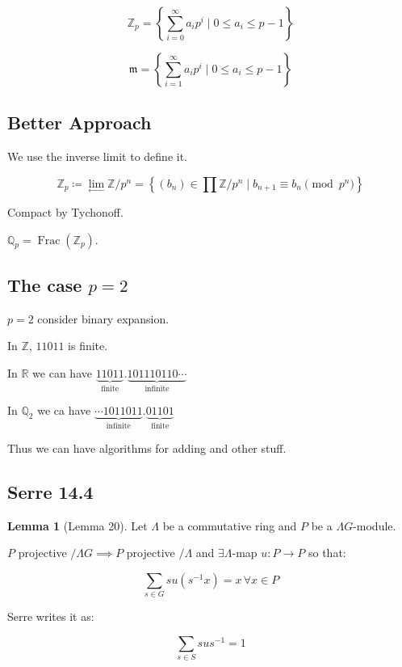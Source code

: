 \documentclass{article}
\theoremstyle{definition}
\newtheorem{lemma}[theorem]{Lemma}
\begin{document}
\[
    \mathbb{Z}_p= \left\{\sum_{i=0}^{\infty} a_i p^i \mid 0 \leq a_i \leq p-1 \right\}
\]

\[
    \mathfrak{m} = \left\{\sum_{i=1}^{\infty} a_i p^i \mid 0 \leq a_i \leq p-1 \right\}
\]

\subsection*{Better Approach}

We use the inverse limit to define it.

\[
    \mathbb{Z}_p \coloneqq \lim_{\leftarrow} \mathbb{Z} / p^n = \left\{ (b_n) \in \prod \mathbb{Z} / p^n \mid b_{n+1} \equiv b_n \pmod{p^n}\right\}  
\]

Compact by Tychonoff.

\(\mathbb{Q}_p = \operatorname{Frac}(\mathbb{Z}_p)\).

\subsection*{The case \(p=2\)}

\(p=2\) consider binary expansion.

In \(\mathbb{Z}\), \(11011\) is finite.

In \(\mathbb{R}\) we can have \(\underbrace{11011}_{\text{finite}}.\underbrace{101110110\cdots}_{\text{infinite}}\) 

In \(\mathbb{Q}_2\) we ca have \(\underbrace{\cdots 1011011}_{\text{infinite}}.\underbrace{01101}_{\text{finite}}\) 

Thus we can have algorithms for adding and other stuff.

\subsection*{Serre 14.4}

\begin{lemma}
    [Lemma 20] Let \(\Lambda\) be a commutative ring and \(P\) be a \(\Lambda G\)-module.

    \(P\) projective \(/ \Lambda G\implies P\) projective \(/ \Lambda\) and \(\exists \Lambda\)-map \(u: P \to P\) so that:
    
    \[
        \sum_{s\in G} s u (s ^{-1} x) = x \, \forall x\in P
    \]

    Serre writes it as:

    \[
        \sum_{s\in S} s u s ^{-1} = 1
    \]
\end{lemma}
\end{document}
